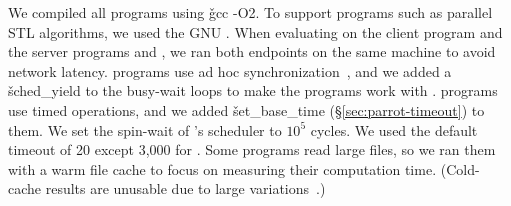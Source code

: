 We compiled all programs using \v{gcc -O2}.  To support
\openmp programs such as parallel STL algorithms, we used the GNU \libgomp.
When evaluating \parrot on the client program \aget and the server programs \openldap
and \redis, we ran both endpoints on the same machine to avoid network
latency.  \nprogadhocsync programs use ad hoc
synchronization~\cite{syncfinder:osdi10}, and we added a \v{sched\_yield}
to the busy-wait loops to make the programs work with \parrot.  \nprogtimeout
programs use \pthread timed operations, and we added \v{set\_base\_time}
(\S\ref{sec:parrot-timeout}) to them. We set the spin-wait of \parrot's scheduler
to $10^5$ cycles.  We used the default \compute timeout of 20 except 3,000
for \ferret.  Some \phoenix programs read large files, so
we ran them with a warm file cache to focus on measuring their computation
time. (Cold-cache results are unusable due to large
variations~\cite{Parrot:github}.)


